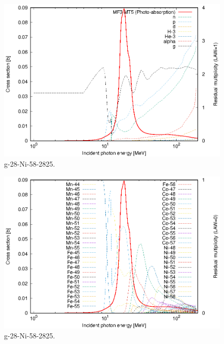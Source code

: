 \begin{figure}
 \includegraphics[width=\linewidth]{eps/g_28-Ni-58_2825.eps}
  \caption{g-28-Ni-58-2825.}
\end{figure}
\begin{figure}
 \includegraphics[width=\linewidth]{eps-law0/g_28-Ni-58_2825.eps}
 \caption{g-28-Ni-58-2825.}
\end{figure}
\newpage \clearpage

